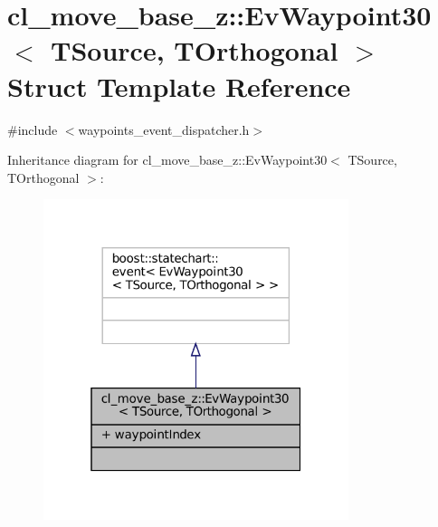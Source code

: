 \hypertarget{structcl__move__base__z_1_1EvWaypoint30}{}\section{cl\+\_\+move\+\_\+base\+\_\+z\+:\+:Ev\+Waypoint30$<$ T\+Source, T\+Orthogonal $>$ Struct Template Reference}
\label{structcl__move__base__z_1_1EvWaypoint30}


{\ttfamily \#include $<$waypoints\+\_\+event\+\_\+dispatcher.\+h$>$}



Inheritance diagram for cl\+\_\+move\+\_\+base\+\_\+z\+:\+:Ev\+Waypoint30$<$ T\+Source, T\+Orthogonal $>$\+:
\nopagebreak
\begin{figure}[H]
\begin{center}
\leavevmode
\includegraphics[width=253pt]{structcl__move__base__z_1_1EvWaypoint30__inherit__graph}
\end{center}
\end{figure}



